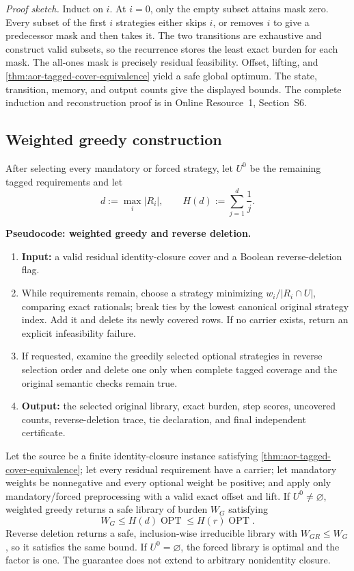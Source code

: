 \noindent\emph{Proof sketch.}
Induct on \(i\).  At \(i=0\), only the empty subset attains mask zero.  Every
subset of the first \(i\) strategies either skips \(i\), or removes \(i\) to
give a predecessor mask and then takes it.  The two transitions are exhaustive
and construct valid subsets, so the recurrence stores the least exact burden
for each mask.  The all-ones mask is precisely residual feasibility.  Offset,
lifting, and \cref{thm:aor-tagged-cover-equivalence} yield a safe global
optimum.  The state, transition, memory, and output counts give the displayed
bounds.  The complete induction and reconstruction proof is in Online
Resource~1, Section~S6.

\subsection{Weighted greedy construction}
\label{subsec:aor-weighted-greedy}

After selecting every mandatory or forced strategy, let \(U^0\) be the
remaining tagged requirements and let
\[
 d:=\max_i |R_i|,\qquad H(d):=\sum_{j=1}^d\frac1j.
\]

\noindent\textbf{Pseudocode: weighted greedy and reverse deletion.}
\begin{enumerate}
 \item \textbf{Input:} a valid residual identity-closure cover and a Boolean
       reverse-deletion flag.
 \item While requirements remain, choose a strategy minimizing
       \(w_i/|R_i\cap U|\), comparing exact rationals; break ties by the lowest
       canonical original strategy index.  Add it and delete its newly covered
       rows.  If no carrier exists, return an explicit infeasibility failure.
 \item If requested, examine the greedily selected optional strategies in
       reverse selection order and delete one only when complete tagged
       coverage and the original semantic checks remain true.
 \item \textbf{Output:} the selected original library, exact burden, step
       scores, uncovered counts, reverse-deletion trace, tie declaration, and
       final independent certificate.
\end{enumerate}

\begin{theorem}
\label{thm:aor-weighted-greedy}
Let the source be a finite identity-closure instance satisfying
\cref{thm:aor-tagged-cover-equivalence}; let every residual requirement have a
carrier; let mandatory weights be nonnegative and every optional weight be
positive; and apply only mandatory/forced preprocessing with a valid exact
offset and lift.  If \(U^0\neq\varnothing\), weighted greedy returns a safe
library of burden \(W_G\) satisfying
\[
 W_G\leq H(d)\operatorname{OPT}\leq H(r)\operatorname{OPT}.
\]
Reverse deletion returns a safe, inclusion-wise irreducible library with
\(W_{GR}\leq W_G\), so it satisfies the same bound.  If \(U^0=\varnothing\),
the forced library is optimal and the factor is one.  The guarantee does not
extend to arbitrary nonidentity closure.
\end{theorem}

